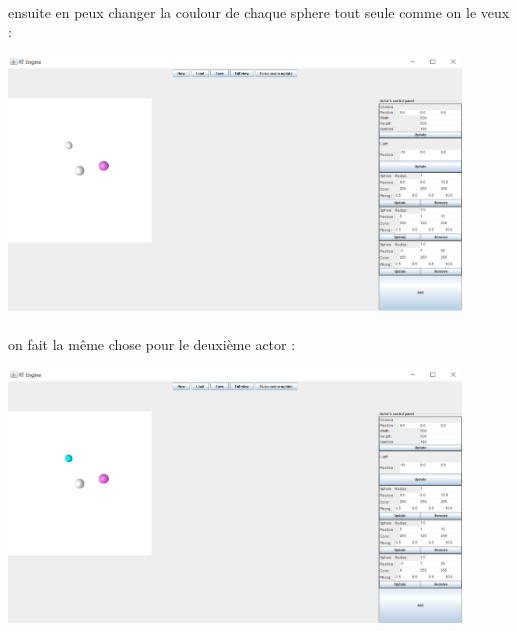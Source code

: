 \documentclass[12pt]{article}
\begin{document}
		\paragraph{}
            ensuite en peux changer la coulour de chaque sphere tout seule comme on le veux :
		        \begin{center}
	           	\includegraphics[width=0.9\textwidth]{./images/firstsphere.png}
		       	\end{center}
			
		\paragraph{}
            on fait la même chose pour le deuxième actor :
		        \begin{center}
	    	    \includegraphics[width=0.9\textwidth]{./images/secondsphere.png}
			    \end{center}
		\newpage
\end{document}
